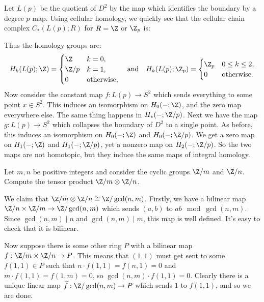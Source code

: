 \documentclass[11pt,letterpaper]{article}
\begin{document}
\begin{solution}
    \quad Let $L(p)$ be the quotient of $D^2$ by the map which identifies the boundary by a degree $p$ map. Using cellular homology, we quickly see that the cellular chain complex $C_*(L(p); R)$ for $R = \Z$ or $\Z_p$ is:
    \begin{center}
    \end{center}
    Thus the homology groups are:
    \[
        H_k(L(p); \Z) = \begin{cases}
            \Z & k = 0,\\
            \Z / p & k = 1,\\
            0 & \text{otherwise},
        \end{cases}\quad\text{and}\quad H_k(L(p); \Z_p) = \begin{cases}
            \Z_p & 0\leq k \leq 2,\\
            0 &\text{otherwise}.
        \end{cases}
    \]
    \quad Now consider the constant map $f : L(p) \to S^2$ which sends everything to some point $x\in S^2$. This induces an isomorphism on $H_0(-; \Z)$, and the zero map everywhere else. The same thing happens in $H_*(-; \Z /p)$. Next we have the map $g : L(p) \to S^2$ which collapses the boundary of $D^2$ to a single point. As before, this induces an isomorphism on $H_0(-; \Z)$ and $H_0(-; \Z/p)$. We get a zero map on $H_1(-; \Z)$ and $H_1(-; \Z/p)$, yet a nonzero map on $H_2(-; \Z /p)$. So the two maps are not homotopic, but they induce the same maps of integral homology. 
\end{solution}

\begin{problem}
    Let $m, n$ be positive integers and consider the cyclic groups $\Z/m$ and $\Z/n$. Compute the tensor product $\Z/m \otimes \Z/n$.
\end{problem}

\begin{solution}
    \quad We claim that $\Z/m \otimes \Z /n\cong \Z /\gcd(n,m)$. Firstly, we have a bilinear map $\Z /n \times \Z /m \to \Z /\gcd(n,m)$ which sends $(a,b)$ to $ab \mod \gcd(n,m)$. Since $\gcd(n,m) \mid n$ and $\gcd(n,m) \mid m$, this map is well defined. It's easy to check that it is bilinear.

    \quad Now suppose there is some other ring $P$ with a bilinear map $f : \Z /m \times \Z /n \to P$. This means that $(1,1)$ must get sent to some $f(1,1)\in P$ such that $n\cdot f(1,1) = f(n,1)=0$ and $m\cdot f(1,1)=f(1,m)=0$, so $\gcd(n,m) \cdot f(1,1) = 0$. Clearly there is a unique linear map $\widetilde{f} : \Z /\gcd(n,m) \to P$ which sends $1$ to $f(1,1)$, and so we are done. 
\end{solution}
\end{document}

